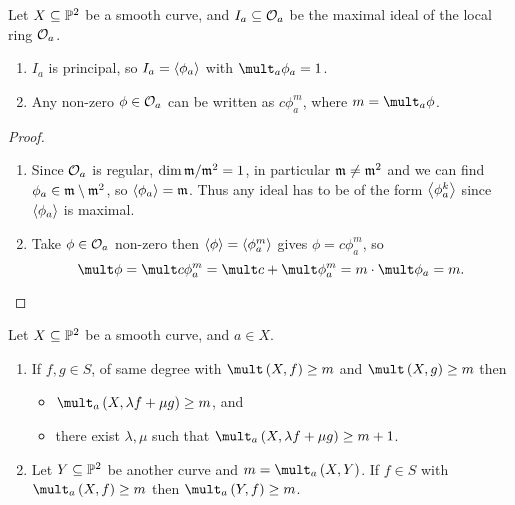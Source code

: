 \begin{lemma}
Let $ X \subseteq \mathbb{P}^2 $ be a smooth curve, and $ I_a \subseteq \mathcal{O}_a $ be the maximal ideal of the local ring $ \mathcal{O}_a $.
\begin{enumerate}
\item $ I_a $ is principal, so $ I_a = \left\langle \phi_a \right\rangle $ with $ \mult_a \phi_a = 1 $.
\item Any non-zero $ \phi \in \mathcal{O}_a $ can be written as $ c\phi_a^m $, where $ m = \mult_a \phi $.
\end{enumerate}
\end{lemma}

\begin{proof}
\hfill
\begin{enumerate}
\item Since $ \mathcal{O}_a $ is regular, $ \dim \mathfrak{m} / \mathfrak{m}^2 = 1 $, in particular $ \mathfrak{m} \ne \mathfrak{m}^2 $ and we can find $ \phi_a \in \mathfrak{m} \setminus \mathfrak{m}^2 $, so $ \left\langle \phi_a \right\rangle = \mathfrak{m} $. Thus any ideal has to be of the form $ \left\langle \phi_a^k \right\rangle $ since $ \left\langle \phi_a \right\rangle $ is maximal.
\item Take $ \phi \in \mathcal{O}_a $ non-zero then $ \left\langle \phi \right\rangle = \left\langle \phi_a^m \right\rangle $ gives $ \phi = c\phi_a^m $, so
$$ \mult \phi = \mult c\phi_a^m = \mult c + \mult \phi_a^m = m \cdot \mult \phi_a = m. $$
\end{enumerate}
\end{proof}

\begin{lemma}
Let $ X \subseteq \mathbb{P}^2 $ be a smooth curve, and $ a \in X $.
\begin{enumerate}
\item If $ f, g \in S $, of same degree with $ \mult \br{X, f} \ge m $ and $ \mult \br{X, g} \ge m $ then
\begin{itemize}
\item $ \mult_a \br{X, \lambda f + \mu g} \ge m $, and
\item there exist $ \lambda, \mu $ such that $ \mult_a \br{X, \lambda f + \mu g} \ge m + 1 $.
\end{itemize}
\item Let $ Y \subseteq \mathbb{P}^2 $ be another curve and $ m = \mult_a \br{X, Y} $. If $ f \in S $ with $ \mult_a \br{X, f} \ge m $ then $ \mult_a \br{Y, f} \ge m $.
\end{enumerate}
\end{lemma}

